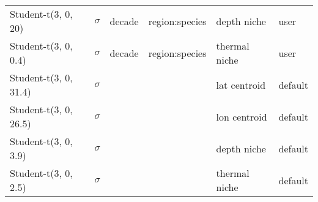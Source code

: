\begin{table}
\begin{tabular}[t]{llllll}
Student-t(3, 0, 20) & $\sigma$ & decade & region:species & depth niche & user\\
\addlinespace
Student-t(3, 0, 0.4) & $\sigma$ & decade & region:species & thermal niche & user\\
Student-t(3, 0, 31.4) & $\sigma$ &  &  & lat centroid & default\\
Student-t(3, 0, 26.5) & $\sigma$ &  &  & lon centroid & default\\
Student-t(3, 0, 3.9) & $\sigma$ &  &  & depth niche & default\\
Student-t(3, 0, 2.5) & $\sigma$ &  &  & thermal niche & default\\
\bottomrule
\end{tabular}
\end{table}
